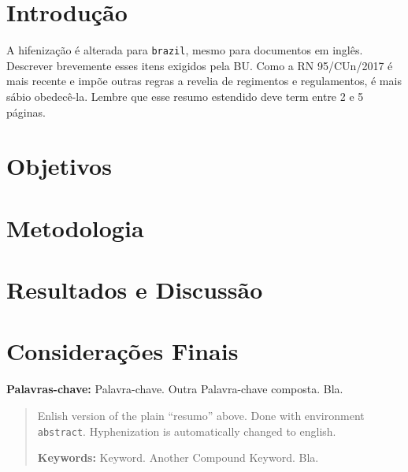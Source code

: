 \documentclass[embeddedlogo]{../ufsc-thesis-rn46-2019}
\begin{document}
\begin{resumo}
  \section*{Introdução} 
  A hifenização é alterada para \texttt{brazil}, mesmo para documentos em inglês. Descrever brevemente esses itens exigidos pela BU. Como a RN 95/CUn/2017 é mais recente e impõe outras regras a revelia de regimentos e regulamentos, é mais sábio obedecê-la. Lembre que esse resumo estendido deve term entre 2 e 5 páginas.
  
  \lipsum[1]
  \section*{Objetivos} 
  \lipsum[2]
  \section*{Metodologia} 
  \lipsum[3]
  \section*{Resultados e Discussão} 
  \lipsum[4]
  \section*{Considerações Finais} 
  \lipsum[5]

  \vspace{\baselineskip}  %
  \textbf{Palavras-chave:} Palavra-chave. Outra Palavra-chave composta. Bla.
\end{resumo}


\begin{abstract}
  Enlish version of the plain ``resumo'' above. Done with environment
  \texttt{abstract}. Hyphenization is automatically changed to english.

  \vspace{\baselineskip} 
  \textbf{Keywords:} Keyword. Another Compound Keyword. Bla.
\end{abstract}

\listoffigures*  %
\end{document}
